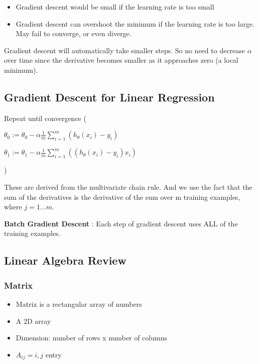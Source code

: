\documentclass{article}
\begin{document}
\begin{itemize}
    \item Gradient descent would be small if the learning rate is too small
    \item Gradient descent can overshoot the minimum if the learning rate is too large. May fail to converge, or even diverge.
\end{itemize}


Gradient descent will automatically take smaller steps. So no need to decrease $\alpha$ over time since the derivative becomes smaller as it approaches zero (a local minimum).




\subsection{Gradient Descent for Linear Regression}


Repeat until convergence (

$\theta_0 := \theta_0 - \alpha \frac{1}{m} \sum_{i=1}^m (h_\theta (x_i) - y_i)$

$\theta_1 := \theta_1 - \alpha \frac{1}{m} \sum_{i=1}^m \left( (h_\theta (x_i) - y_i) x_i \right)$

)


These are derived from the multivariate chain rule. And we use the fact that the sum of the derivatives is the derivative of the sum over m training examples, where $j = 1...m$. 






\hspace{}




\textbf{Batch Gradient Descent} : Each step of gradient descent uses ALL of the training examples. 




\subsection{Linear Algebra Review}

\subsubsection{Matrix}
\begin{itemize}
    \item Matrix is a rectangular array of numbers
    \item A 2D array 
    \item Dimension: number of rows x number of columns
    \item $A_{ij} = i,j$ entry 
\end{itemize}
\end{document}
